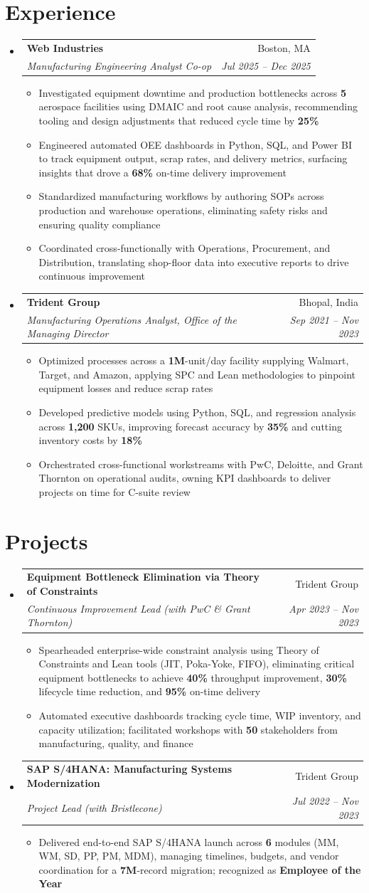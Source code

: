 \documentclass[letterpaper,10pt]{article}
\makeatletter
\newcommand{\resumeSubheading}[4]{
  \vspace{1pt}\item
    \begin{tabular*}{0.97\textwidth}[t]{l@{\extracolsep{\fill}}r}
      \textbf{#1} & #2 \\
      \textit{\small#3} & \textit{\small #4} \\
    \end{tabular*}\vspace{-4pt}
}
\newcommand{\resumeItem}[1]{\item\small{{#1 \vspace{-1pt}}}}
\newcommand{\resumeItemListStart}{\begin{itemize}[leftmargin=0.15in, label=$\bullet$]}
\newcommand{\resumeItemListEnd}{\end{itemize}\vspace{-2pt}}
\newcommand{\resumeSubHeadingListStart}{\begin{itemize}[leftmargin=0.15in, label={}]}
\newcommand{\resumeSubHeadingListEnd}{\end{itemize}}
\makeatother
\begin{document}
\section{Experience}
\resumeSubHeadingListStart
\resumeSubheading
{Web Industries}{Boston, MA}
{Manufacturing Engineering Analyst Co-op}{Jul 2025 -- Dec 2025}
\resumeItemListStart
\resumeItem{Investigated equipment downtime and production bottlenecks across \textbf{5} aerospace facilities using DMAIC and root cause analysis, recommending tooling and design adjustments that reduced cycle time by \textbf{25\%}}
\resumeItem{Engineered automated OEE dashboards in Python, SQL, and Power BI to track equipment output, scrap rates, and delivery metrics, surfacing insights that drove a \textbf{68\%} on-time delivery improvement}
\resumeItem{Standardized manufacturing workflows by authoring SOPs across production and warehouse operations, eliminating safety risks and ensuring quality compliance}
\resumeItem{Coordinated cross-functionally with Operations, Procurement, and Distribution, translating shop-floor data into executive reports to drive continuous improvement}
\resumeItemListEnd
\resumeSubheading
{Trident Group}{Bhopal, India}
{Manufacturing Operations Analyst, Office of the Managing Director}{Sep 2021 -- Nov 2023}
\resumeItemListStart
\resumeItem{Optimized processes across a \textbf{1M}-unit/day facility supplying Walmart, Target, and Amazon, applying SPC and Lean methodologies to pinpoint equipment losses and reduce scrap rates}
\resumeItem{Developed predictive models using Python, SQL, and regression analysis across \textbf{1,200} SKUs, improving forecast accuracy by \textbf{35\%} and cutting inventory costs by \textbf{18\%}}
\resumeItem{Orchestrated cross-functional workstreams with PwC, Deloitte, and Grant Thornton on operational audits, owning KPI dashboards to deliver projects on time for C-suite review}
\resumeItemListEnd
\resumeSubHeadingListEnd

\section{Projects}
\resumeSubHeadingListStart
\resumeSubheading
{Equipment Bottleneck Elimination via Theory of Constraints}{Trident Group}
{Continuous Improvement Lead (with PwC \& Grant Thornton)}{Apr 2023 -- Nov 2023}
\resumeItemListStart
\resumeItem{Spearheaded enterprise-wide constraint analysis using Theory of Constraints and Lean tools (JIT, Poka-Yoke, FIFO), eliminating critical equipment bottlenecks to achieve \textbf{40\%} throughput improvement, \textbf{30\%} lifecycle time reduction, and \textbf{95\%} on-time delivery}
\resumeItem{Automated executive dashboards tracking cycle time, WIP inventory, and capacity utilization; facilitated workshops with \textbf{50} stakeholders from manufacturing, quality, and finance}
\resumeItemListEnd
\resumeSubheading
{SAP S/4HANA: Manufacturing Systems Modernization}{Trident Group}
{Project Lead (with Bristlecone)}{Jul 2022 -- Nov 2023}
\resumeItemListStart
\resumeItem{Delivered end-to-end SAP S/4HANA launch across \textbf{6} modules (MM, WM, SD, PP, PM, MDM), managing timelines, budgets, and vendor coordination for a \textbf{7M}-record migration; recognized as \textbf{Employee of the Year}}
\resumeItemListEnd
\resumeSubHeadingListEnd
\end{document}
